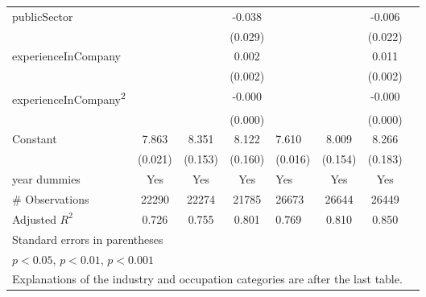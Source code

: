 \begin{longtable}{l*{3}{c}|l*{3}{c}}
		publicSector      &                     &                     &      -0.038         &                     &                     &      -0.006         \\
		&                     &                     &     (0.029)         &                     &                     &     (0.022)         \\
		experienceInCompany &                     &                     &       0.002         &                     &                     &       0.011\sym{***}\\
		&                     &                     &     (0.002)         &                     &                     &     (0.002)         \\
		experienceInCompany\textsuperscript{2}&                     &                     &      -0.000         &                     &                     &      -0.000\sym{***}\\
		&                     &                     &     (0.000)         &                     &                     &     (0.000)         \\
		Constant            &       7.863\sym{***}&       8.351\sym{***}&       8.122\sym{***}&       7.610\sym{***}&       8.009\sym{***}&       8.266\sym{***}\\
		&     (0.021)         &     (0.153)         &     (0.160)         &     (0.016)         &     (0.154)         &     (0.183)         \\
		year dummies        &         Yes         &         Yes         &         Yes         &         Yes         &         Yes         &         Yes         \\
		\midrule
	\#	Observations        &       22290         &       22274         &       21785         &       26673         &       26644         &       26449         \\
		Adjusted \(R^{2}\)  &       0.726         &       0.755         &       0.801         &       0.769         &       0.810         &       0.850         \\
		\bottomrule
		\multicolumn{7}{l}{\footnotesize Standard errors in parentheses}\\
		\multicolumn{7}{l}{\footnotesize \sym{*} \(p<0.05\), \sym{**} \(p<0.01\), \sym{***} \(p<0.001\)} \\
		\multicolumn{7}{l}{Explanations of the industry and occupation categories are after the last table.}
          \label{tab:et_wage_full}
	\end{longtable}


